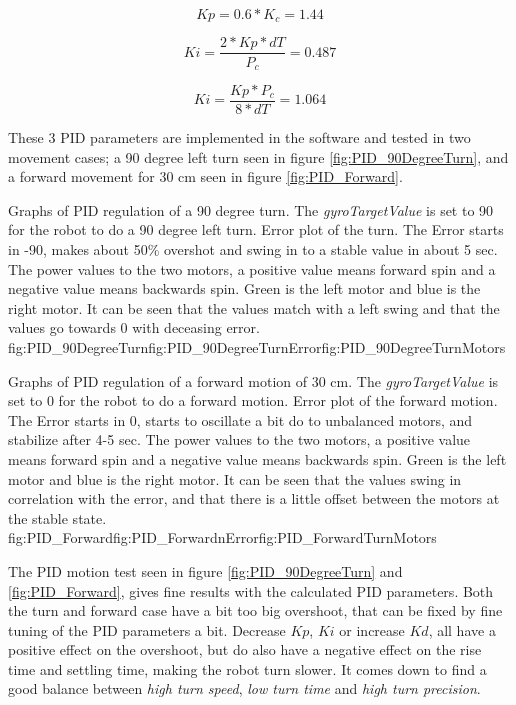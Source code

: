$$ Kp = 0.6 * K_c = 1.44 $$

$$ Ki = \frac{2*Kp*dT}{P_c} = 0.487 $$

$$ Ki = \frac{Kp*P_c}{8*dT} = 1.064 $$

These 3 PID parameters are implemented in the software and tested in two movement cases; a 90 degree left turn seen in figure \ref{fig:PID_90DegreeTurn}, and a forward movement for 30 cm seen in figure \ref{fig:PID_Forward}.


{Graphs of PID regulation of a 90 degree turn. The \emph{gyroTargetValue} is set to 90 for the robot to do a 90 degree left turn.}
{Error plot of the turn. The Error starts in -90, makes about 50\% overshot and swing in to a stable value in about 5 sec.}
{The power values to the two motors, a positive value means forward spin and a negative value means backwards spin. Green is the left motor and blue is the right motor. It can be seen that the values match with a left swing and that the values go towards 0 with deceasing error.}
{fig:PID_90DegreeTurn}{fig:PID_90DegreeTurnError}{fig:PID_90DegreeTurnMotors}

{Graphs of PID regulation of a forward motion of 30 cm. The \emph{gyroTargetValue} is set to 0 for the robot to do a forward motion.}
{Error plot of the forward motion. The Error starts in 0, starts to oscillate a bit do to unbalanced motors, and stabilize after 4-5 sec.}
{The power values to the two motors, a positive value means forward spin and a negative value means backwards spin. Green is the left motor and blue is the right motor. It can be seen that the values swing in correlation with the error, and that there is a little offset between the motors at the stable state.}
{fig:PID_Forward}{fig:PID_ForwardnError}{fig:PID_ForwardTurnMotors}

\FloatBarrier

The PID motion test seen in figure \ref{fig:PID_90DegreeTurn} and \ref{fig:PID_Forward}, gives fine results with the calculated PID parameters.
Both the turn and forward case have a bit too big overshoot, that can be fixed by fine tuning of the PID parameters a bit.
Decrease \emph{$Kp$}, \emph{$Ki$} or increase \emph{$Kd$}, all have a positive effect on the overshoot, but do also have a negative effect on the rise time and settling time, making the robot turn slower.
It comes down to find a good balance between \emph{high turn speed}, \emph{low turn time} and \emph{high turn precision}.

\pagebreak